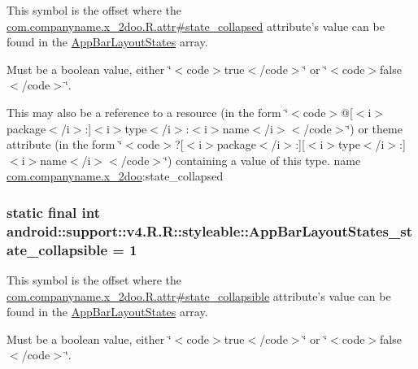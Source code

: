 This symbol is the offset where the \hyperlink{classcom_1_1companyname_1_1x__2doo_1_1_r_1_1attr_524f5fa78382c2b0f61943e946654db2}{com.companyname.x\_\-2doo.R.attr\#state\_\-collapsed} attribute's value can be found in the \hyperlink{classandroid_1_1support_1_1v4_1_1_r_1_1styleable_5c129aa478b2daed266bd62010493d47}{AppBarLayoutStates} array.

Must be a boolean value, either \char`\"{}$<$code$>$true$<$/code$>$\char`\"{} or \char`\"{}$<$code$>$false$<$/code$>$\char`\"{}. 

This may also be a reference to a resource (in the form \char`\"{}$<$code$>$@\mbox{[}$<$i$>$package$<$/i$>$:\mbox{]}$<$i$>$type$<$/i$>$:$<$i$>$name$<$/i$>$$<$/code$>$\char`\"{}) or theme attribute (in the form \char`\"{}$<$code$>$?\mbox{[}$<$i$>$package$<$/i$>$:\mbox{]}\mbox{[}$<$i$>$type$<$/i$>$:\mbox{]}$<$i$>$name$<$/i$>$$<$/code$>$\char`\"{}) containing a value of this type.  name \hyperlink{namespacecom_1_1companyname_1_1x__2doo}{com.companyname.x\_\-2doo}:state\_\-collapsed \hypertarget{classandroid_1_1support_1_1v4_1_1_r_1_1styleable_fac3d50c34559fba4e1874fb3151376d}{
\subsubsection[{AppBarLayoutStates\_\-state\_\-collapsible}]{\setlength{\rightskip}{0pt plus 5cm}static final int android::support::v4.R.R::styleable::AppBarLayoutStates\_\-state\_\-collapsible = 1}}
\label{classandroid_1_1support_1_1v4_1_1_r_1_1styleable_fac3d50c34559fba4e1874fb3151376d}


This symbol is the offset where the \hyperlink{classcom_1_1companyname_1_1x__2doo_1_1_r_1_1attr_cd9a413427cd311b68a50782bf2b9426}{com.companyname.x\_\-2doo.R.attr\#state\_\-collapsible} attribute's value can be found in the \hyperlink{classandroid_1_1support_1_1v4_1_1_r_1_1styleable_5c129aa478b2daed266bd62010493d47}{AppBarLayoutStates} array.

Must be a boolean value, either \char`\"{}$<$code$>$true$<$/code$>$\char`\"{} or \char`\"{}$<$code$>$false$<$/code$>$\char`\"{}. 

